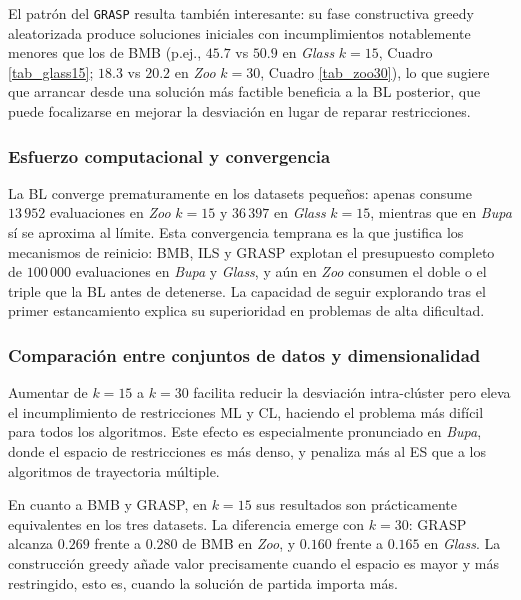 \documentclass[a4paper,12pt]{article}%
\begin{document}
El patrón del \texttt{GRASP} resulta también interesante: su fase constructiva greedy aleatorizada produce soluciones iniciales con incumplimientos notablemente menores que los de BMB (p.ej., $45.7$ vs $50.9$ en \textit{Glass} $k=15$, Cuadro \ref{tab_glass15}; $18.3$ vs $20.2$ en \textit{Zoo} $k=30$, Cuadro \ref{tab_zoo30}), lo que sugiere que arrancar desde una solución más factible beneficia a la BL posterior, que puede focalizarse en mejorar la desviación en lugar de reparar restricciones.

\subsubsection{Esfuerzo computacional y convergencia}

\noindent La BL converge prematuramente en los datasets pequeños: apenas consume $13\,952$ evaluaciones en \textit{Zoo} $k=15$ y $36\,397$ en \textit{Glass} $k=15$, mientras que en \textit{Bupa} sí se aproxima al límite. Esta convergencia temprana es la que justifica los mecanismos de reinicio: BMB, ILS y GRASP explotan el presupuesto completo de $100\,000$ evaluaciones en \textit{Bupa} y \textit{Glass}, y aún en \textit{Zoo} consumen el doble o el triple que la BL antes de detenerse. La capacidad de seguir explorando tras el primer estancamiento explica su superioridad en problemas de alta dificultad.

\subsubsection{Comparación entre conjuntos de datos y dimensionalidad}

\noindent Aumentar de $k=15$ a $k=30$ facilita reducir la desviación intra-clúster pero eleva el incumplimiento de restricciones ML y CL, haciendo el problema más difícil para todos los algoritmos. Este efecto es especialmente pronunciado en \textit{Bupa}, donde el espacio de restricciones es más denso, y penaliza más al ES que a los algoritmos de trayectoria múltiple.

En cuanto a BMB y GRASP, en $k=15$ sus resultados son prácticamente equivalentes en los tres datasets. La diferencia emerge con $k=30$: GRASP alcanza $0.269$ frente a $0.280$ de BMB en \textit{Zoo}, y $0.160$ frente a $0.165$ en \textit{Glass}. La construcción greedy añade valor precisamente cuando el espacio es mayor y más restringido, esto es, cuando la solución de partida importa más.
\end{document}

